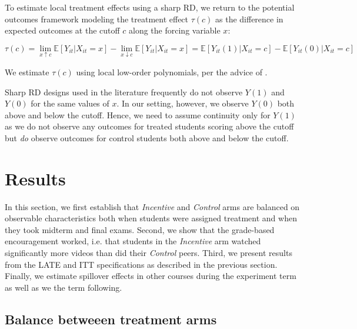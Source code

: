 \documentclass[12pt]{article}
\begin{document}
To estimate local treatment effects using a sharp RD, we return to the potential outcomes framework modeling the treatment effect $\tau(c)$ as the difference in expected outcomes at the cutoff $c$ along the forcing variable $x$:

\begin{equation} \label{rd_po}
	\tau(c) = \lim_{x \uparrow c} \mathbb{E}[Y_{it} | X_{it} = x] - \lim_{x \downarrow c} \mathbb{E}[Y_{it} | X_{it} = x] = \mathbb{E}[Y_{it}(1) | X_{it} = c] - \mathbb{E}[Y_{it}(0) | X_{it} = c]
\end{equation}

We estimate $\tau(c)$ using local low-order polynomials, per the advice of \textcite{gi2019}.

Sharp RD designs used in the literature frequently do not observe $Y(1)$ and $Y(0)$ for the same values of $x$. In our setting, however, we observe $Y(0)$ both above and below the cutoff. Hence, we need to assume continuity only for $Y(1)$ as we do not observe any outcomes for treated students scoring above the cutoff but \textit{do} observe outcomes for control students both above and below the cutoff.






\section{Results} \label{results}

In this section, we first establish that \textit{Incentive} and \textit{Control} arms are balanced on observable characteristics both when students were assigned treatment and when they took midterm and final exams. Second, we show that the grade-based encouragement worked, i.e. that students in the \textit{Incentive} arm watched significantly more videos than did their \textit{Control} peers. Third, we present results from the LATE and ITT specifications as described in the previous section. Finally, we estimate spillover effects in other courses during the experiment term as well as we the term following.

\subsection{Balance betweeen treatment arms}
\end{document}
